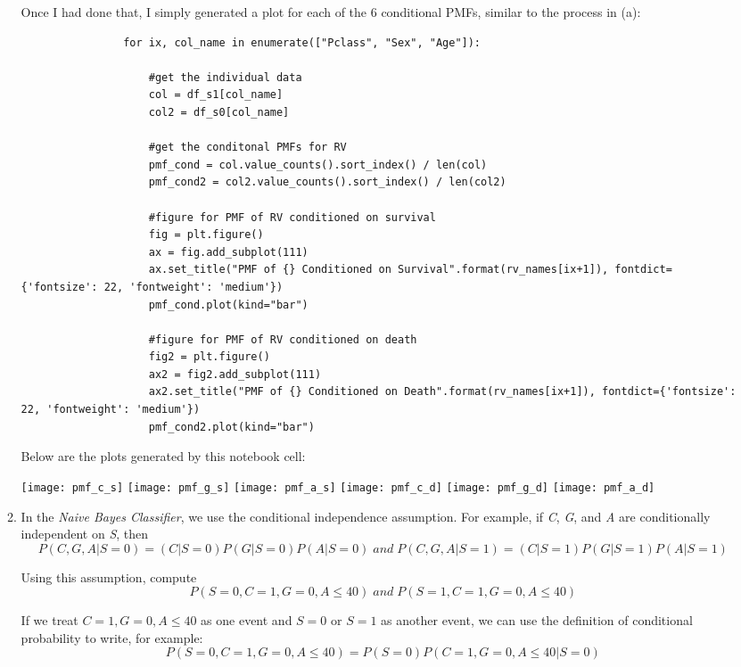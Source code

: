 \documentclass[]{article}
\begin{document}
\begin{enumerate}
\begin{enumerate}
    		Once I had done that, I simply generated a plot for each of the 6 conditional PMFs, similar to the process in (a):
    		
    		\begin{lstlisting}
    			for ix, col_name in enumerate(["Pclass", "Sex", "Age"]):
    				
    				#get the individual data
	    			col = df_s1[col_name]
	    			col2 = df_s0[col_name]
	    			
	    			#get the conditonal PMFs for RV
	    			pmf_cond = col.value_counts().sort_index() / len(col)
	    			pmf_cond2 = col2.value_counts().sort_index() / len(col2)
	    			
	    			#figure for PMF of RV conditioned on survival
	    			fig = plt.figure()
	    			ax = fig.add_subplot(111)    
	    			ax.set_title("PMF of {} Conditioned on Survival".format(rv_names[ix+1]), fontdict={'fontsize': 22, 'fontweight': 'medium'})
	    			pmf_cond.plot(kind="bar")
	    			
	    			#figure for PMF of RV conditioned on death
	    			fig2 = plt.figure()
	    			ax2 = fig2.add_subplot(111)
	    			ax2.set_title("PMF of {} Conditioned on Death".format(rv_names[ix+1]), fontdict={'fontsize': 22, 'fontweight': 'medium'})
	    			pmf_cond2.plot(kind="bar")
    		\end{lstlisting}
    	
    		Below are the plots generated by this notebook cell:
    		
    		\texttt{[image: pmf\_c\_s]}
    		\texttt{[image: pmf\_g\_s]}
    		\texttt{[image: pmf\_a\_s]}
    		\texttt{[image: pmf\_c\_d]}
    		\texttt{[image: pmf\_g\_d]}
    		\texttt{[image: pmf\_a\_d]}
    		
    		\pagebreak
    		
    		\item In the \textit{Naive  Bayes  Classifier}, we use the conditional independence assumption. For example, if \textit{C}, \textit{G}, and \textit{A} are conditionally independent on \textit{S}, then
    		\[
    		P(C,G,A|S=0) = (C|S=  0)P(G|S=  0)P(A|S=  0) \; and \; P(C,G,A|S=1) = (C|S=1)P(G|S=1)P(A|S=1) 
    		\]
    		
    		Using this assumption, compute
    		\[
    		P(S= 0,C= 1,G= 0,A\leq40) \; and \; P(S=1,C= 1,G= 0,A\leq40)
    		\]
    		
    		If we treat $C= 1,G= 0,A\leq40$ as one event and $S=0$ or $S=1$ as another event, we can use the definition of conditional probability to write, for example: 
    		\begin{equation}
				P(S=0,C=1,G=0,A\leq40) = P(S=0)P(C=1,G=0,A\leq40|S=0)
    		\end{equation}
    		

\end{enumerate}
\end{enumerate}
\end{document}
